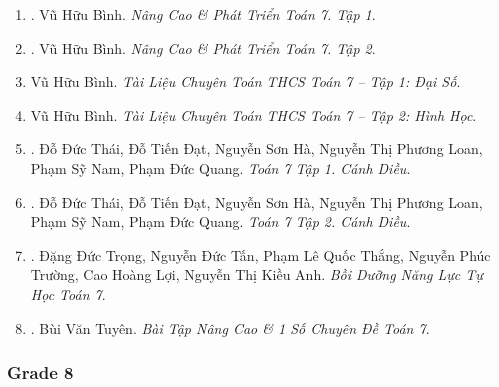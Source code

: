 \documentclass{article}
\begin{document}
\begin{enumerate}
	\item \cite{Binh_Toan_7_tap_1}. Vũ Hữu Bình. \textit{Nâng Cao \& Phát Triển Toán 7. Tập 1}.\hfill{}
	\item \cite{Binh_Toan_7_tap_2}. Vũ Hữu Bình. \textit{Nâng Cao \& Phát Triển Toán 7. Tập 2}.\hfill{}
	\item Vũ Hữu Bình. \textit{Tài Liệu Chuyên Toán THCS Toán 7 -- Tập 1: Đại Số}.
	\item Vũ Hữu Bình. \textit{Tài Liệu Chuyên Toán THCS Toán 7 -- Tập 2: Hình Học}.
	\item \cite{SGK_Toan_7_Canh_Dieu_tap_1}. Đỗ Đức Thái, Đỗ Tiến Đạt, Nguyễn Sơn Hà, Nguyễn Thị Phương Loan, Phạm Sỹ Nam, Phạm Đức Quang. \textit{Toán 7 Tập 1. Cánh Diều}.\hfill{}
	\item \cite{SGK_Toan_7_Canh_Dieu_tap_2}. Đỗ Đức Thái, Đỗ Tiến Đạt, Nguyễn Sơn Hà, Nguyễn Thị Phương Loan, Phạm Sỹ Nam, Phạm Đức Quang. \textit{Toán 7 Tập 2. Cánh Diều}.\hfill{}
	\item \cite{Trong_Toan_7_2022}. Đặng Đức Trọng, Nguyễn Đức Tấn, Phạm Lê Quốc Thắng, Nguyễn Phúc Trường, Cao Hoàng Lợi, Nguyễn Thị Kiều Anh. \textit{Bồi Dưỡng Năng Lực Tự Học Toán 7}.\hfill{\sf[bought]}
	\item \cite{Tuyen_Toan_7}. Bùi Văn Tuyên. \textit{Bài Tập Nâng Cao \& 1 Số Chuyên Đề Toán 7}.\hfill{\sf[bought]}
\end{enumerate}

\subsubsection{Grade 8}
\end{document}
